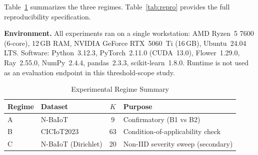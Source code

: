 Table~\ref{tab:regimes} summarizes the three regimes.
Table~\ref{tab:repro} provides the full reproducibility specification.

\textbf{Environment.}
All experiments ran on a single workstation: AMD Ryzen~5 7600 (6-core), 12\,GB RAM,
NVIDIA GeForce RTX~5060~Ti (16\,GB), Ubuntu~24.04 LTS.
Software: Python~3.12.3, PyTorch~2.11.0 (CUDA~13.0), Flower~1.29.0,
Ray~2.55.0, NumPy~2.4.4, pandas~2.3.3, scikit-learn~1.8.0.
Runtime is not used as an evaluation endpoint in this threshold-scope study.

\begin{table}[t]
  \caption{Experimental Regime Summary}
  \label{tab:regimes}
  \centering
  \footnotesize
  \setlength{\tabcolsep}{5pt}%
  \renewcommand{\arraystretch}{1.2}%
  \begin{tabular}{@{}llcl@{}}
    \toprule
    Regime & Dataset & $K$ & Purpose \\
    \midrule
    A & N-BaIoT & 9 & Confirmatory (B1 vs B2) \\
    B & CICIoT2023 & 63 & Condition-of-applicability check \\
    C & N-BaIoT (Dirichlet) & 20 & Non-IID severity sweep (secondary) \\
    \bottomrule
  \end{tabular}
\end{table}

